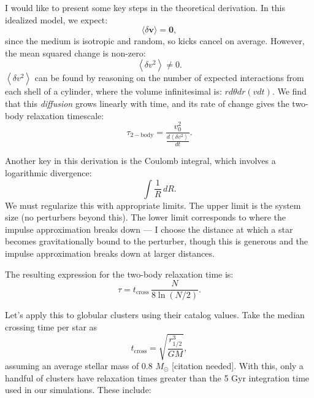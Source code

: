             I would like to present some key steps in the theoretical derivation. In this idealized model, we expect:
            \begin{equation}
                \langle \delta \mathbf{v} \rangle = \mathbf{0},
            \end{equation}
            since the medium is isotropic and random, so kicks cancel on average. However, the mean squared change is non-zero:
            \begin{equation}
                \left\langle \delta v^2 \right\rangle \neq 0.
            \end{equation}
            $\left\langle \delta v^2 \right\rangle$ can be found by reasoning on the number of expected interactions from each shell of a cylinder, where the volume infinitesimal is: $rd\theta dr(vdt)$. We find that this \textit{diffusion} grows linearly with time, and its rate of change gives the two-body relaxation timescale:
            \begin{equation}
                \tau_\mathrm{2-body} = \frac{v_0^2}{\frac{d \left\langle \delta v^2 \right\rangle}{dt}}.
            \end{equation}

            Another key in this derivation is the Coulomb integral, which involves a logarithmic divergence:
            \[
            \int \frac{1}{R} \, dR.
            \]
            We must regularize this with appropriate limits. The upper limit is the system size (no perturbers beyond this). The lower limit corresponds to where the impulse approximation breaks down — I choose the distance at which a star becomes gravitationally bound to the perturber, though this is generous and the impulse approximation breaks down at larger distances.

            The resulting expression for the two-body relaxation time is:
            \begin{equation}
                \tau = t_\mathrm{cross} \, \frac{N}{8 \ln(N/2)}.
            \end{equation}

            Let's apply this to globular clusters using their catalog values. Take the median crossing time per star as
            \[
            t_\mathrm{cross} = \sqrt{\frac{r_{1/2}^3}{GM}},
            \]
            assuming an average stellar mass of 0.8 $M_\odot$ [citation needed]. With this, only a handful of clusters have relaxation times greater than the 5 Gyr integration time used in our simulations. These include: 
            
